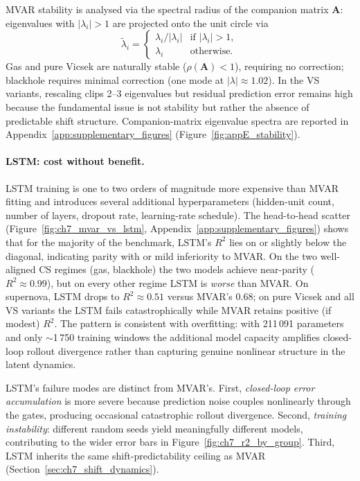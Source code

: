 MVAR stability is analysed via the spectral radius of the companion matrix
$\mathbf{A}$: eigenvalues with $|\lambda_i|>1$ are projected onto
the unit circle via
\begin{equation}
  \tilde\lambda_i
  = \begin{cases}
      \lambda_i/|\lambda_i| & \text{if } |\lambda_i|>1, \\
      \lambda_i             & \text{otherwise.}
    \end{cases}
  \label{eq:eigenvalue_projection}
\end{equation}
Gas and pure Vicsek are naturally stable ($\rho(\mathbf{A})<1$),
requiring no correction; blackhole requires minimal correction (one mode
at $|\lambda|\approx 1.02$).  In the VS variants, rescaling clips 2--3
eigenvalues but residual prediction error remains high because the
fundamental issue is not stability but rather the absence of predictable
shift structure.  Companion-matrix eigenvalue spectra are reported in
Appendix~\ref{app:supplementary_figures}
(Figure~\ref{fig:appE_stability}).

\paragraph{LSTM: cost without benefit.}
\label{sec:ch7_lstm_modes}

LSTM training is one to two orders of magnitude more expensive than MVAR
fitting and introduces several additional hyperparameters (hidden-unit
count, number of layers, dropout rate, learning-rate schedule).
The head-to-head scatter (Figure~\ref{fig:ch7_mvar_vs_lstm},
Appendix~\ref{app:supplementary_figures}) shows that
for the majority of the benchmark, LSTM's $R^2$ lies on or
slightly below the diagonal, indicating parity with or mild inferiority
to MVAR\@.  On the two well-aligned CS regimes (gas, blackhole) the two
models achieve near-parity ($R^2\approx 0.99$), but on every other regime
LSTM is \emph{worse} than MVAR\@.  On supernova, LSTM drops to
$R^2\approx 0.51$ versus MVAR's $0.68$; on pure Vicsek and all VS
variants the LSTM fails catastrophically while MVAR retains positive
(if modest) $R^2$.
The pattern is consistent with overfitting: with 211\,091 parameters and
only $\sim$1\,750 training windows the additional model capacity amplifies
closed-loop rollout divergence rather than capturing genuine nonlinear
structure in the latent dynamics.

LSTM's failure modes are distinct from MVAR's.  First, \emph{closed-loop
error accumulation} is more severe because prediction noise couples
nonlinearly through the gates, producing occasional catastrophic rollout
divergence.  Second, \emph{training instability}: different random seeds
yield meaningfully different models, contributing to the wider error bars in
Figure~\ref{fig:ch7_r2_by_group}.  Third, LSTM inherits the same
shift-predictability ceiling as MVAR (Section~\ref{sec:ch7_shift_dynamics}).

